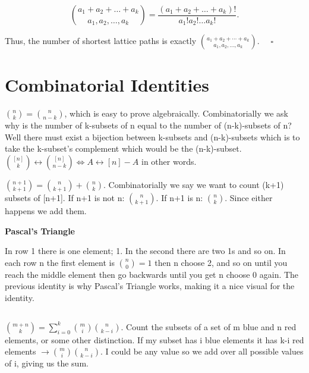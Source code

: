 \documentclass[12pt]{article}
\begin{document}
\[
\binom{a_1 + a_2 + \dots + a_k}{a_1, a_2, \dots, a_k} = \frac{(a_1 + a_2 + \dots + a_k)!}{a_1! a_2! \dots a_k!}.
\]

\noindent
Thus, the number of shortest lattice paths is exactly \(\binom{a_1+a_2+\cdots +a_k}{a_1, a_2, \dots, a_k}\). \(\quad \square\)

\section{Combinatorial Identities}
\(\binom{n}{k} = \binom{n}{n-k}\), which is easy to prove algebraically. 
Combinatorially we ask why is the number of k-subsets of n equal to the number 
of (n-k)-subsets of n? Well there must exist a bijection between k-subsets and 
(n-k)-subsets which is to take the k-subset's complement which would be the 
(n-k)-subset. 
\(\binom{[n]}{k} \leftrightarrow \binom{[n]}{n-k} \Leftrightarrow 
A \leftrightarrow [n]-A\) in other words.

\noindent 
\(\binom{n+1}{k+1} = \binom{n}{k+1}+\binom{n}{k}\). 
Combinatorially we say we want to count (k+1) subsets of [n+1]. 
If n+1 is not n: \(\binom{n}{k+1}\). If n+1 is n: \(\binom{n}{k}\). Since either 
happens we add them.

\noindent
\textbf{Pascal's Triangle}

\noindent 
In row 1 there is one element; 1. In the second there are two 1s and so on. 
In each row n the first element is \(\binom{n}{0} = 1\) then n choose 2, and so 
on until you reach the middle element then go backwards until you get n choose 
0 again. The previous identity is why Pascal's Triangle works, 
making it a nice visual for the identity.

\subsection*{}
\(\binom{m+n}{k} = \displaystyle\sum_{i=0}^{k} \binom{m}{i} \binom{n}{k-i}\). 
Count the subsets of a set of m blue and n red elements, or some other distinction.
If my subset has i blue elements it has k-i red elements 
\(\rightarrow \binom{m}{i}\binom{n}{k-i}\). I could be any value so we add over all 
possible values of i, giving us the sum. 
 
\end{document}
